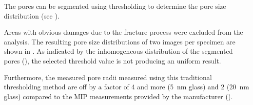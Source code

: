 The pores can be segmented using thresholding to determine the pore size distribution (see ). %

Areas with obvious damages due to the fracture process were excluded from the analysis.
The resulting pore size distributions of two images per specimen are shown in .
As indicated by the inhomogeneous distribution of the segmented pores (), the selected threshold value is not producing an uniform result.

Furthermore, the measured pore radii measured using this traditional thresholding method are off by a factor of \num{4} and more (\qty{5}{\nano\meter} glass) and \num{2} (\qty{20}{\nano\meter} glass) compared to the \ac{MIP} measurements provided by the manufacturer ().



